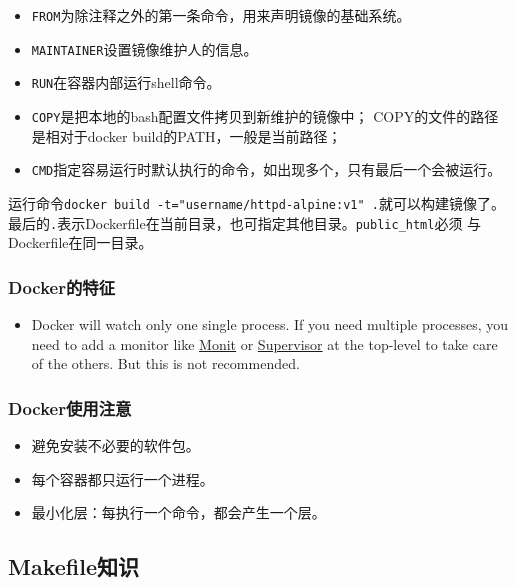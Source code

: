 \documentclass[]{article}
\providecommand{\tightlist}{%
  \setlength{\itemsep}{0pt}\setlength{\parskip}{0pt}}
\numberwithin{figure}{section}
\numberwithin{table}{section}
\begin{document}
\begin{itemize}
\tightlist
\item
  \texttt{FROM}为除注释之外的第一条命令，用来声明镜像的基础系统。
\item
  \texttt{MAINTAINER}设置镜像维护人的信息。
\item
  \texttt{RUN}在容器内部运行shell命令。
\item
  \texttt{COPY}是把本地的bash配置文件拷贝到新维护的镜像中；
  COPY的文件的路径是相对于docker build的PATH，一般是当前路径；
\item
  \texttt{CMD}指定容易运行时默认执行的命令，如出现多个，只有最后一个会被运行。
\end{itemize}

运行命令\texttt{docker\ build\ -t="username/httpd-alpine:v1"\ .}就可以构建镜像了。
最后的\texttt{.}表示Dockerfile在当前目录，也可指定其他目录。\texttt{public\_html}必须
与Dockerfile在同一目录。

\hypertarget{docker_single_process}{%
\subsubsection{Docker的特征}\label{docker_single_process}}

\begin{itemize}
\tightlist
\item
  Docker will watch only one single process.
  If you need multiple processes,
  you need to add a monitor like \href{http://mmonit.com/monit/}{Monit} or
  \href{http://supervisord.org/}{Supervisor} at the top-level to take
  care of the others. But this is not recommended.
\end{itemize}

\hypertarget{docker_attention}{%
\subsubsection{Docker使用注意}\label{docker_attention}}

\begin{itemize}
\item
  避免安装不必要的软件包。
\item
  每个容器都只运行一个进程。
\item
  最小化层：每执行一个命令，都会产生一个层。
\end{itemize}

\hypertarget{makefile}{%
\subsection{Makefile知识}\label{makefile}}
\end{document}
